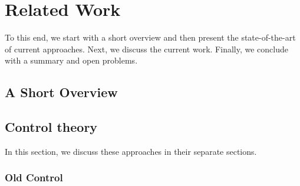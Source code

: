 \chapter{Related Work}
\label{chap:related_work}

%
To this end, we start with a short overview and then present the state-of-the-art of current approaches. Next, we discuss the current work.
%
Finally, we conclude with a summary and open problems.


\section{A Short Overview}
\label{s:basics}



\section{Control theory}
\label{s:single_control}

%
In this section, we discuss these approaches in their separate sections.
%

\subsection{Old Control}
\label{ss:oc}


